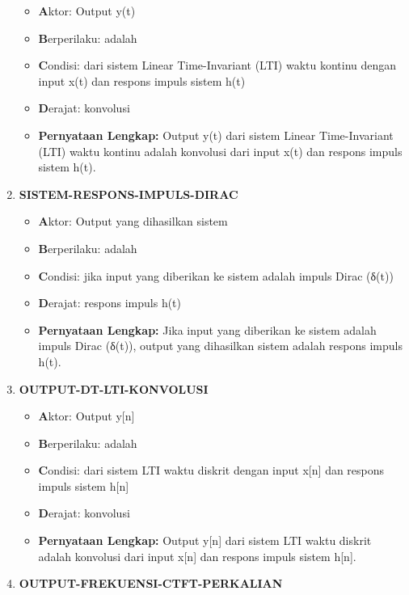 \documentclass[
  letterpaper,
  DIV=11,
  numbers=noendperiod]{scrreprt}
\begin{document}
\begin{enumerate}
  \begin{itemize}
  \item
    \textbf{A}ktor: Output y(t)
  \item
    \textbf{B}erperilaku: adalah
  \item
    \textbf{C}ondisi: dari sistem Linear Time-Invariant (LTI) waktu
    kontinu dengan input x(t) dan respons impuls sistem h(t)
  \item
    \textbf{D}erajat: konvolusi
  \item
    \textbf{Pernyataan Lengkap:} Output y(t) dari sistem Linear
    Time-Invariant (LTI) waktu kontinu adalah konvolusi dari input x(t)
    dan respons impuls sistem h(t).
  \end{itemize}
\item
  \textbf{SISTEM-RESPONS-IMPULS-DIRAC}

  \begin{itemize}
  \item
    \textbf{A}ktor: Output yang dihasilkan sistem
  \item
    \textbf{B}erperilaku: adalah
  \item
    \textbf{C}ondisi: jika input yang diberikan ke sistem adalah impuls
    Dirac (δ(t))
  \item
    \textbf{D}erajat: respons impuls h(t)
  \item
    \textbf{Pernyataan Lengkap:} Jika input yang diberikan ke sistem
    adalah impuls Dirac (δ(t)), output yang dihasilkan sistem adalah
    respons impuls h(t).
  \end{itemize}
\item
  \textbf{OUTPUT-DT-LTI-KONVOLUSI}

  \begin{itemize}
  \item
    \textbf{A}ktor: Output y{[}n{]}
  \item
    \textbf{B}erperilaku: adalah
  \item
    \textbf{C}ondisi: dari sistem LTI waktu diskrit dengan input
    x{[}n{]} dan respons impuls sistem h{[}n{]}
  \item
    \textbf{D}erajat: konvolusi
  \item
    \textbf{Pernyataan Lengkap:} Output y{[}n{]} dari sistem LTI waktu
    diskrit adalah konvolusi dari input x{[}n{]} dan respons impuls
    sistem h{[}n{]}.
  \end{itemize}
\item
  \textbf{OUTPUT-FREKUENSI-CTFT-PERKALIAN}


\end{enumerate}
\end{document}
